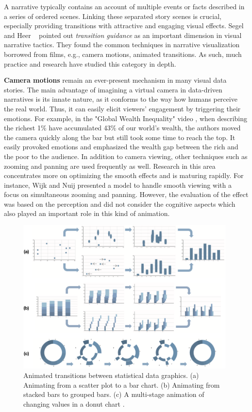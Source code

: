 A narrative typically contains an account of multiple events or facts described in a series of ordered scenes. Linking these separated story scenes is crucial, especially providing transitions with attractive and engaging visual effects. Segel and Heer ~\cite{Segel2010} pointed out \textit{transition guidance} as an important dimension in visual narrative tactics. They found the common techniques in narrative visualization borrowed from films, e.g., camera motions, animated transitions. As such, much practice and research have studied this category in depth.  

\textbf{Camera motions} remain an ever-present mechanism in many visual data stories. The main advantage of imagining a virtual camera in data-driven narratives is its innate nature, as it conforms to the way how humans perceive the real world. Thus, it can easily elicit viewers' engagement by triggering their emotions. For example, in the "Global Wealth Inequality" video \cite{globalnequality}, when describing the richest 1\% have accumulated 43\% of our world's wealth, the authors moved the camera quickly along the bar but still took some time to reach the top. It easily provoked emotions and emphasized the wealth gap between the rich and the poor to the audience. In addition to camera viewing, other techniques such as zooming and panning are used frequently as well. Research in this area concentrates more on optimizing the smooth effects and is maturing rapidly.  For instance, Wijk and Nuij \cite{Wijk2004} presented a model to handle smooth viewing with a focus on simultaneous zooming and panning. However, the evaluation of the effect was based on the perception and did not consider the cognitive aspects which also played an important role in this kind of animation. 

\begin{figure}[htb]
	\centering 
	\includegraphics[width=0.98\textwidth]{figure/transition.png} 
	\caption{ Animated transitions between statistical data graphics. (a) Animating from a scatter plot to a bar chart. (b) Animating from stacked bars to grouped bars. (c) A multi-stage animation of changing values in a donut chart \cite{Heer2007}. } 
	\label{animated} 
\end{figure}


